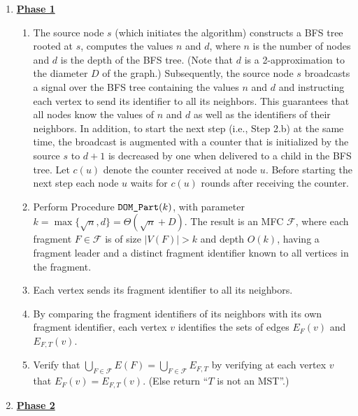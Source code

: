 \documentclass[11pt,letter]{article}
\def\DOM{\mbox{\tt DOM\_Part}}
\def\cF{\mathcal{F}}
\begin{document}
\begin{enumerate}
\item
{\bf\underline{Phase 1}}

\begin{enumerate}
\item \label{send_ids} The source node $s$ (which initiates the algorithm) constructs a BFS tree rooted at $s$, computes the values $n$ and $d$, where $n$ is the number of nodes and $d$ is the depth of the BFS tree. (Note that $d$ is a 2-approximation to the diameter $D$ of the graph.) Subsequently, the source node $s$ broadcasts a signal over the BFS tree containing the values $n$ and $d$ and instructing each vertex to send its identifier to all its neighbors. 
This guarantees that all nodes know the values of $n$ and $d$ as well as the identifiers of their neighbors. 
In addition, to start the next step (i.e., Step 2.b) at the same time, the broadcast is augmented with a counter that is initialized by the source  $s$ to $d+1$ is decreased by one when delivered to a child in the BFS tree. Let $c(u)$ denote the counter received at node $u$. Before starting the next step each node $u$ waits for $c(u)$ rounds after receiving the counter.

\item \label{dom} 
Perform  Procedure $\DOM(k)$, with parameter $k=\max \{\sqrt n,d\}=\Theta(\sqrt n+D)$. 
The result is an MFC $\cF$, where each fragment 
$F\in \cF$ is of size $|V(F)|>k$ 
and depth $O(k)$, having a fragment leader and a distinct fragment identifier 
known to all vertices in the fragment.
\item \label{send_fragment} 
Each vertex sends its fragment identifier to all its neighbors.
\item  \label{identify_int_vs_ext_edges}
By comparing the fragment identifiers of its neighbors with its own fragment identifier, each vertex $v$ identifies the sets of  edges  $E_{F}(v)$ and $E_{F,T}(v)$.
\item \label{verify_internal_edges}
Verify that 
$\bigcup_{F\in \cF} E(F) = \bigcup_{F\in \cF} E_{F,T}$ 
by verifying at each vertex $v$ that $E_{F}(v)=E_{F,T}(v)$.
(Else return ``$T$ is not an MST''.)
\end{enumerate}

\item 
{\bf \underline{Phase 2}}
\begin{enumerate}


\end{enumerate}
\end{enumerate}
\end{document}
